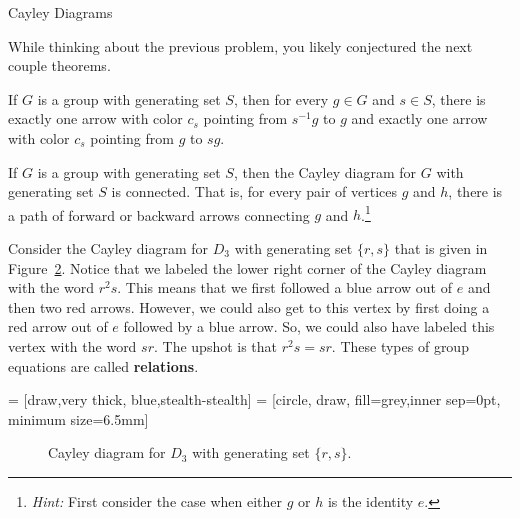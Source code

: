 \begin{section}{Cayley Diagrams}
\begin{figure}[!ht]
\caption{}
\label{fig:nonRegular}
\end{figure}

While thinking about the previous problem, you likely conjectured the next couple theorems.

\begin{theorem}
If $G$ is a group with generating set $S$, then for every $g\in G$ and $s\in S$, there is exactly one arrow with color $c_s$ pointing from $s^{-1}g$ to $g$ and exactly one arrow with color $c_s$ pointing from $g$ to $sg$. 
\end{theorem}

\begin{theorem}
If $G$ is a group with generating set $S$, then the Cayley diagram for $G$ with generating set $S$ is connected.  That is, for every pair of vertices $g$ and $h$, there is a path of forward or backward arrows connecting $g$ and $h$.\footnote{\emph{Hint:} First consider the case when either $g$ or $h$ is the identity $e$.}
\end{theorem}

Consider the Cayley diagram for $D_3$ with generating set $\{r,s\}$ that is given in Figure~\ref{fig:D3}. Notice that we labeled the lower right corner of the Cayley diagram with the word $r^2s$.  This means that we first followed a blue arrow out of $e$ and then two red arrows.  However, we could also get to this vertex by first doing a red arrow out of $e$ followed by a blue arrow.  So, we could also have labeled this vertex with the word $sr$.  The upshot is that $r^2s=sr$.  These types of group equations are called \textbf{relations}.

 = [draw,very  thick, blue,stealth-stealth]
 = [circle, draw, fill=grey,inner sep=0pt, minimum size=6.5mm]

\begin{figure}
\centering
{}
\caption{Cayley diagram for $D_3$ with generating set $\{r,s\}$.}\label{fig:D3}
\end{figure}


\end{section}
